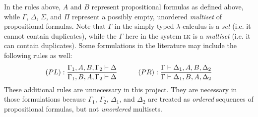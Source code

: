 In the rules above, $A$ and $B$ represent propositional formulas as defined above, while $\Gamma$, $\Delta$, $\Sigma$, and $\Pi$ represent a possibly empty, unordered \textit{multiset} of propositional formulas. Note that $\Gamma$ in the simply typed $\lambda$-calculus is a \textit{set} (i.e. it cannot contain duplicates), while the $\Gamma$ here in the system \textsc{lk} is a \textit{multiset} (i.e. it can contain duplicates). Some formulations in the literature may include the following rules as well:
{
    \derivationfont
    \[
        (PL): \frac{\Gamma_1, A, B, \Gamma_2 \vdash \Delta}{\Gamma_1, B, A, \Gamma_2 \vdash \Delta} \quad\quad\quad (PR): \frac{\Gamma \vdash \Delta_1, A, B, \Delta_2}{\Gamma \vdash \Delta_1, B, A, \Delta_2}
    \]
}%
These additional rules are unnecessary in this project. They are necessary in those formulations because $\Gamma_1$, $\Gamma_2$, $\Delta_1$, and $\Delta_2$ are treated as \textit{ordered} sequences of propositional formulas, but not \textit{unordered} multisets.



